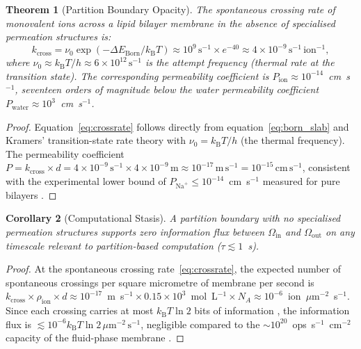 \documentclass[11pt,twocolumn,a4paper]{article}
\newtheorem{theorem}{Theorem}[section]
\newtheorem{corollary}[theorem]{Corollary}
\theoremstyle{definition}
\theoremstyle{remark}
\newcommand{\kB}{k_{\mathrm{B}}}
\begin{document}
\begin{theorem}[Partition Boundary Opacity]
\label{thm:opacity}
The spontaneous crossing rate of monovalent ions across a lipid bilayer
membrane in the absence of specialised permeation structures is:
\begin{equation}
k_{\mathrm{cross}} = \nu_0 \exp(-\Delta E_{\mathrm{Born}} / \kB T)
\approx 10^{9}\,\mathrm{s}^{-1} \times e^{-40}
\approx 4 \times 10^{-9}\,\mathrm{s}^{-1}\,\mathrm{ion}^{-1},
\label{eq:crossrate}
\end{equation}
where $\nu_0 \approx \kB T / h \approx 6 \times 10^{12}\,\mathrm{s}^{-1}$ is
the attempt frequency (thermal rate at the transition state).
The corresponding permeability coefficient is
$P_{\mathrm{ion}} \approx 10^{-14}$~cm~s$^{-1}$, seventeen orders of magnitude
below the water permeability coefficient $P_{\mathrm{water}} \approx 10^{3}$~cm~s$^{-1}$.
\end{theorem}

\begin{proof}
Equation~\eqref{eq:crossrate} follows directly from
equation~\eqref{eq:born_slab} and Kramers' transition-state rate theory
\citep{kramers1940} with $\nu_0 = \kB T / h$ (the thermal frequency).
The permeability coefficient $P = k_{\mathrm{cross}} \times d = 4 \times
10^{-9}\,\mathrm{s}^{-1} \times 4 \times 10^{-9}\,\mathrm{m} \approx
10^{-17}\,\mathrm{m\,s}^{-1} = 10^{-15}\,\mathrm{cm\,s}^{-1}$, consistent
with the experimental lower bound of $P_{\mathrm{Na}^+} \leq 10^{-14}$~cm~s$^{-1}$
measured for pure bilayers \citep{hille2001, walter1983}.
\end{proof}

\begin{corollary}[Computational Stasis]
\label{cor:stasis}
A partition boundary with no specialised permeation structures supports
zero information flux between $\Omega_{\mathrm{in}}$ and $\Omega_{\mathrm{out}}$
on any timescale relevant to partition-based computation ($\tau \lesssim 1$~s).
\end{corollary}

\begin{proof}
At the spontaneous crossing rate~\eqref{eq:crossrate}, the expected number of
spontaneous crossings per square micrometre of membrane per second is
$k_{\mathrm{cross}} \times \rho_{\mathrm{ion}} \times d \approx 10^{-17}$~m~s$^{-1}
\times 0.15 \times 10^3$~mol~L$^{-1} \times N_A \approx 10^{-6}$~ion~$\mu$m$^{-2}$~s$^{-1}$.
Since each crossing carries at most $\kB T \ln 2$ bits of information
\citep{landauer1961}, the information flux is $\lesssim 10^{-6} \kB T \ln 2
\,\mu\mathrm{m}^{-2}\,\mathrm{s}^{-1}$, negligible compared to the
$\sim 10^{20}$~ops~s$^{-1}$~cm$^{-2}$ capacity of the fluid-phase membrane
\citep{companion1}.
\end{proof}
\end{document}

